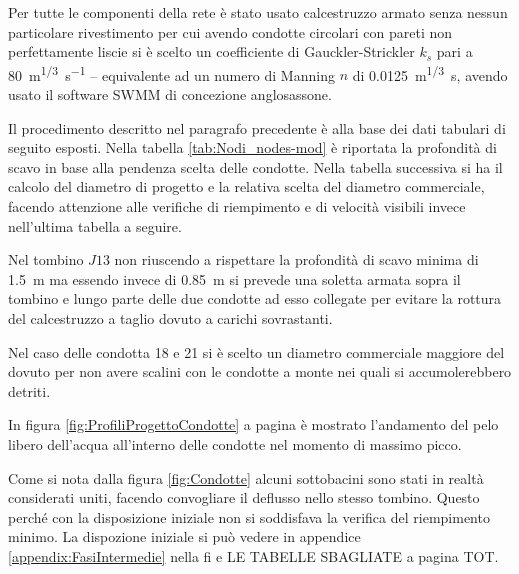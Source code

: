 Per tutte le componenti della rete è stato usato calcestruzzo armato senza nessun particolare rivestimento per cui avendo condotte circolari con pareti non perfettamente liscie si è scelto un coefficiente di Gauckler-Strickler $k_s$ pari a \SI{80}{\metre\tothe{1/3}\per\second} -- equivalente ad un numero di Manning $n$ di \SI{0.0125}{\metre\tothe{1/3}\second}, avendo usato il software SWMM di concezione anglosassone.

Il procedimento descritto nel paragrafo precedente è alla base dei dati tabulari di seguito esposti.  
Nella tabella \ref{tab:Nodi_nodes-mod} è riportata la profondità di scavo in base alla pendenza scelta delle condotte. 
Nella tabella successiva si ha il calcolo del diametro di progetto e la relativa scelta del diametro commerciale, facendo attenzione alle verifiche di riempimento e di velocità visibili invece nell'ultima tabella a seguire.

Nel tombino $J13$ non riuscendo a rispettare la profondità di scavo minima di \SI{1.5}{\metre} ma essendo invece di \SI{0.85}{\metre} si prevede una soletta armata sopra il tombino e lungo parte delle due condotte ad esso collegate per evitare la rottura del calcestruzzo a taglio dovuto a carichi sovrastanti. 

Nel caso delle condotta 18 e 21 si è scelto un diametro commerciale maggiore del dovuto per non avere scalini con le condotte a monte nei quali si accumolerebbero detriti. 

In figura \ref{fig:ProfiliProgettoCondotte} a pagina \pageref{fig:ProfiliProgettoCondotte} è mostrato l'andamento del pelo libero dell'acqua all'interno delle condotte nel momento di massimo picco.

Come si nota dalla figura \ref{fig:Condotte} alcuni sottobacini sono stati in realtà considerati uniti, facendo convogliare il deflusso nello stesso tombino.
Questo perché con la disposizione iniziale non si soddisfava la verifica del riempimento minimo.
La dispozione iniziale si può vedere in appendice \ref{appendix:FasiIntermedie} nella fi e LE TABELLE SBAGLIATE a pagina TOT.

